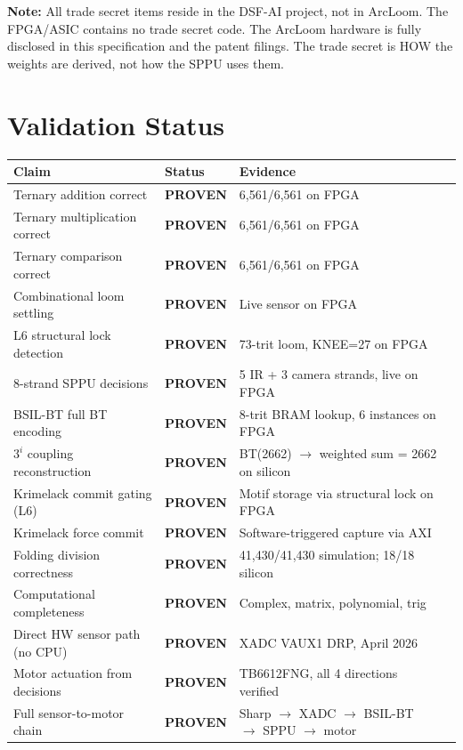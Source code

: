 \documentclass[11pt, a4paper]{article}
\begin{document}
\textbf{Note:} All trade secret items reside in the DSF-AI project,
not in ArcLoom. The FPGA/ASIC contains no trade secret code. The
ArcLoom hardware is fully disclosed in this specification and the
patent filings. The trade secret is HOW the weights are derived,
not how the SPPU uses them.

\section{Validation Status}

\begin{center}
\begin{tabular}{@{}llll@{}}
\toprule
\textbf{Claim} & \textbf{Status} & \textbf{Evidence} \\
\midrule
Ternary addition correct & \textbf{PROVEN} & 6,561/6,561 on FPGA \\
Ternary multiplication correct & \textbf{PROVEN} & 6,561/6,561 on FPGA \\
Ternary comparison correct & \textbf{PROVEN} & 6,561/6,561 on FPGA \\
Combinational loom settling & \textbf{PROVEN} & Live sensor on FPGA \\
L6 structural lock detection & \textbf{PROVEN} & 73-trit loom, KNEE=27 on FPGA \\
8-strand SPPU decisions & \textbf{PROVEN} & 5 IR + 3 camera strands, live on FPGA \\
BSIL-BT full BT encoding & \textbf{PROVEN} & 8-trit BRAM lookup, 6 instances on FPGA \\
$3^i$ coupling reconstruction & \textbf{PROVEN} & BT(2662) $\rightarrow$ weighted sum = 2662 on silicon \\
Krimelack commit gating (L6) & \textbf{PROVEN} & Motif storage via structural lock on FPGA \\
Krimelack force commit & \textbf{PROVEN} & Software-triggered capture via AXI \\
Folding division correctness & \textbf{PROVEN} & 41,430/41,430 simulation; 18/18 silicon \\
Computational completeness & \textbf{PROVEN} & Complex, matrix, polynomial, trig \\
Direct HW sensor path (no CPU) & \textbf{PROVEN} & XADC VAUX1 DRP, April 2026 \\
Motor actuation from decisions & \textbf{PROVEN} & TB6612FNG, all 4 directions verified \\
Full sensor-to-motor chain & \textbf{PROVEN} & Sharp $\rightarrow$ XADC $\rightarrow$ BSIL-BT $\rightarrow$ SPPU $\rightarrow$ motor \\

\end{tabular}
\end{center}
\end{document}
